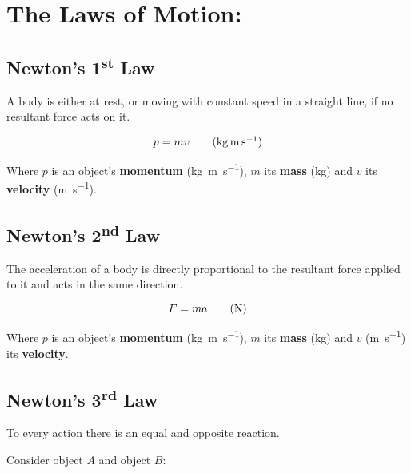 \documentclass[11pt]{article}
\begin{document}
	
	\section{The Laws of Motion: }
	
	
	
	\subsection{Newton's 1\textsuperscript{st} Law}
	\begin{center}
		A body is either at rest, or moving with constant speed in a straight line, if no resultant force acts on it.
	\end{center}
	
	\begin{equation}
		p=mv\tag{\si{\kilogram\meter\per\second}}	
	\end{equation}	
	
	\begin{center}
		Where $p$ is an object's \textbf{momentum} (\si{\kilogram\meter\per\second}), $m$ its \textbf{mass} (\si{\kilogram}) and $v$ its \textbf{velocity} (\si{\meter\per\second}).
	\end{center}
	
	\subsection{Newton's 2\textsuperscript{nd} Law}
	\begin{center}
		The acceleration of a body is directly proportional to the resultant force applied to it  and acts in the same direction.
	\end{center}
	
	\begin{equation}
		F=ma \tag{\si{\newton}}	
	\end{equation}	
	
	\begin{center}
		Where $p$ is an object's \textbf{momentum} (\si{\kilogram\meter\per\second}), $m$ its \textbf{mass} (\si{\kilogram}) and $v$ (\si{\meter\per\second}) its \textbf{velocity}.
	\end{center}
	
	
	\subsection{Newton's 3\textsuperscript{rd} Law}
	\begin{center}
		To every action there is an equal and opposite reaction.
	\end{center}
	\begin{center}
		Consider object $A$ and object $B$:
	\end{center}
	
\end{document}
